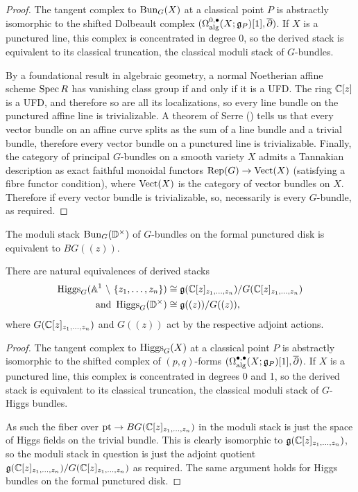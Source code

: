 \documentclass[10pt, oneside, a4paper]{article}
\begin{document}
\begin{proof}
The tangent complex to $\operatorname{Bun}_G(X)$ at a classical point $P$ is abstractly isomorphic to the shifted Dolbeault complex $(\Omega^{0, \bullet}_{\mathrm{alg}}(X; \mathfrak{g}_P)[1], \overline{\partial})$.  If $X$ is a punctured line, this complex is concentrated in degree 0, so the derived stack is equivalent to its classical truncation, the classical moduli stack of $G$-bundles.

By a foundational result in algebraic geometry, a normal Noetherian affine scheme $\operatorname{Spec} R$ has vanishing class group if and only if it is a UFD.  The ring $\mathbb{C}[z]$ is a UFD, and therefore so are all its localizations, so every line bundle on the punctured affine line is trivializable.  A theorem of Serre (\cite[Theorem 1]{Serreprojective}) tells us that every vector bundle on an affine curve splits as the sum of a line bundle and a trivial bundle, therefore every vector bundle on a punctured line is trivializable.  Finally, the category of principal $G$-bundles on a smooth variety $X$ admits a Tannakian description as exact faithful monoidal functors $\operatorname{Rep}(G) \to \operatorname{Vect}(X)$ (satisfying a fibre functor condition), where $\operatorname{Vect}(X)$ is the category of vector bundles on $X$.  Therefore if every vector bundle is trivializable, so, necessarily is every $G$-bundle, as required.
\end{proof}

\begin{corollary}
The moduli stack $\operatorname{Bun}_G(\mathbb{D}^\times)$ of $G$-bundles on the formal punctured disk is equivalent to $BG((z))$.
\end{corollary}

\begin{prop} \label{higgs_bundles_on_disk_prop}
There are natural equivalences of derived stacks 
\begin{align*}
\operatorname{Higgs}_G(\mathbb{A}^1 \ \backslash \  \{z_1, \ldots, z_n\}) &\cong \mathfrak{g}(\mathbb{C}[z]_{z_1, \ldots, z_n})/G(\mathbb{C}[z]_{z_1, \ldots, z_n}) \\
\text{and } \operatorname{Higgs}_G(\mathbb{D}^\times) &\cong \mathfrak{g}((z)) / G((z)),
\end{align*} 
where $G(\mathbb{C}[z]_{z_1, \ldots, z_n})$ and $G((z))$ act by the respective adjoint actions.
\end{prop}

\begin{proof}
The tangent complex to $\operatorname{Higgs}_G(X)$ at a classical point $P$ is abstractly isomorphic to the shifted complex of $(p,q)$-forms $(\Omega^{\bullet, \bullet}_{\mathrm{alg}}(X; \mathfrak{g}_P)[1], \overline{\partial})$.  If $X$ is a punctured line, this complex is concentrated in degrees 0 and 1, so the derived stack is equivalent to its classical truncation, the classical moduli stack of $G$-Higgs bundles. 

As such the fiber over $\operatorname{pt} \to BG(\mathbb{C}[z]_{z_1, \ldots, z_n})$ in the moduli stack is just the space of Higgs fields on the trivial bundle.  This is clearly isomorphic to $\mathfrak{g}(\mathbb{C}[z]_{z_1, \ldots, z_n})$, so the moduli stack in question is just the adjoint quotient $\mathfrak{g}(\mathbb{C}[z]_{z_1, \ldots, z_n})/G(\mathbb{C}[z]_{z_1, \ldots, z_n})$ as required.  The same argument holds for Higgs bundles on the formal punctured disk.
\end{proof}
\end{document}
